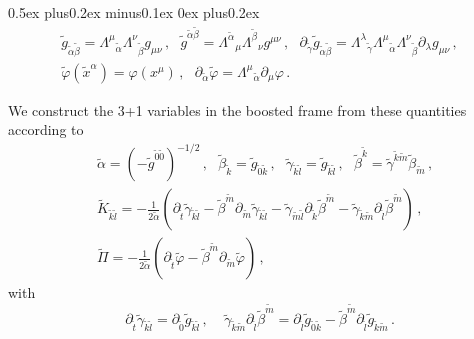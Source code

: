 \begin{list}{\rm{\bf ()}}{
                
             \parsep0.5ex plus0.2ex minus0.1ex \itemsep0ex plus0.2ex}
  \begin{gather}
    \tilde{g}_{\tilde{\alpha}\tilde{\beta}}=
      \Lambda^{\mu}{}_{\tilde{\alpha}}\Lambda^{\nu}{}_{\tilde{\beta}}g_{\mu\nu}
      \,,~~~
    \tilde{g}^{\tilde{\alpha}\tilde{\beta}}=
    \Lambda^{\tilde{\alpha}}{}_{\mu}\Lambda^{\tilde{\beta}}{}_{\nu}g^{\mu\nu}
    \,,~~~
    \partial_{\tilde{\gamma}}\tilde{g}_{\tilde{\alpha}\tilde{\beta}}=
    \Lambda^{\lambda}{}_{\tilde{\gamma}}\Lambda^{\mu}{}_{\tilde{\alpha}}
    \Lambda^{\nu}{}_{\tilde{\beta}}\partial_{\lambda}g_{\mu\nu}
    \,, \nonumber\\
     \tilde{\varphi}(\tilde{x}^{\alpha}) = \varphi(x^{\mu})\,,~~~
    \partial_{\tilde{\alpha}}\tilde{\varphi}=
    \Lambda^{\mu}{}_{\tilde{\alpha}} \partial_{\mu}\varphi\,.
  \end{gather}
  \item We construct the 3+1 variables in the boosted frame from these
  quantities according to
  \begin{align}
    &\tilde{\alpha} = \left(-\tilde{g}^{\tilde{0}\tilde{0}}\right)^{-1/2}
    \,,~~~
    \tilde{\beta}_{\tilde{k}}=\tilde{g}_{\tilde{0}\tilde{k}}
    \,,~~~
    \tilde{\gamma}_{\tilde{k}\tilde{l}}=\tilde{g}_{\tilde{k}\tilde{l}}
    \,,~~~
    \tilde{\beta}^{\tilde{k}}=\tilde{\gamma}^{\tilde{k}\tilde{m}}
    \tilde{\beta}_{\tilde{m}}
    \,, \\
    & \tilde{K}_{\tilde{k}\tilde{l}}=
    -\frac{1}{2\tilde{\alpha}}
    \left(
    \partial_{\tilde{t}}\tilde{\gamma}_{\tilde{k}\tilde{l}}
    -\tilde{\beta}^{\tilde{m}}\partial_{\tilde{m}}\tilde{\gamma}_{\tilde{k}\tilde{l}}
    -\tilde{\gamma}_{\tilde{m}\tilde{l}}\partial_{\tilde{k}}\tilde{\beta}^{\tilde{m}}
    -\tilde{\gamma}_{\tilde{k}\tilde{m}}\partial_{\tilde{l}}\tilde{\beta}^{\tilde{m}}
    \right)\,, \nonumber \\
    &\tilde{\Pi} = -\frac{1}{2\tilde{\alpha}}
    \left(
    \partial_{\tilde{t}}\tilde{\varphi}
    - \tilde{\beta}^{\tilde{m}} \partial_{\tilde{m}}\tilde{\varphi}
    \right)\,,
  \end{align}
  with
  \begin{equation}
    \partial_{\tilde{t}}\tilde{\gamma}_{\tilde{k}\tilde{l}}=
    \partial_{\tilde{0}}\tilde{g}_{\tilde{k}\tilde{l}}
    \,,~~~~~
    \tilde{\gamma}_{\tilde{k}\tilde{m}}
    \partial_{\tilde{l}}\tilde{\beta}^{\tilde{m}}
    =
    \partial_{\tilde{l}}\tilde{g}_{\tilde{0}\tilde{k}}
    - \tilde{\beta}^{\tilde{m}}
    \partial_{\tilde{l}}\tilde{g}_{\tilde{k}\tilde{m}}\,.
  \end{equation}

\end{list}
